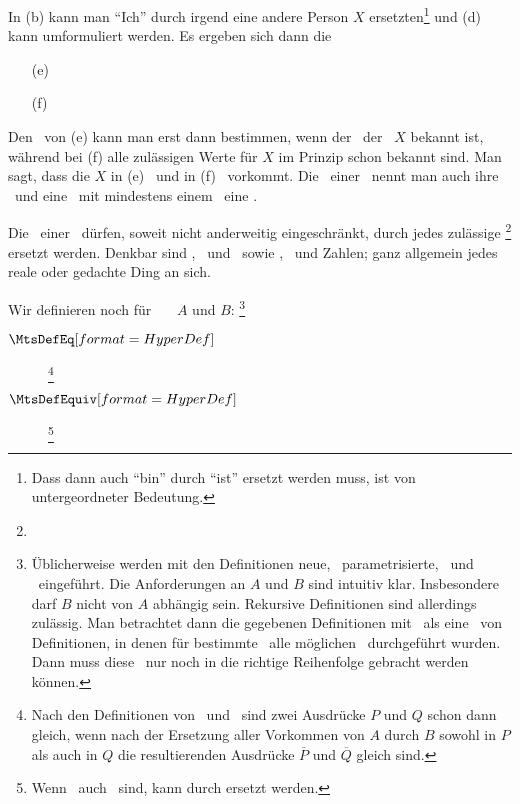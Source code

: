 In (b) kann man "`Ich"' durch irgend eine andere Person $X$ ersetzten\footnote{Dass dann auch "`bin"' durch "`ist"' ersetzt werden muss, ist von untergeordneter Bedeutung.} und (d) kann umformuliert werden.
Es ergeben sich dann die \Aussagen
\begin{enumerate}
	\item[(e)] \label{Bsp:e} 
	\item[(f)] \label{Bsp:f} 
\end{enumerate}
Den \Wahrheitswert\ von (e) kann man erst dann bestimmen, wenn der \Wert\ der \Variablen\ $X$ bekannt ist, während bei (f) alle zulässigen Werte für $X$ im Prinzip schon bekannt sind.
Man sagt, dass die \Variable $X$ in (e) \freiV\ und in (f) \gebundenV\ vorkommt.
Die \freienVariablen\ einer \Aussage\ nennt man auch ihre \Parameter\ und eine \Aussage\ mit mindestens einem \Parameter\ eine \parametrisierteAussage.

Die \Parameter\ einer \Aussage\ dürfen, soweit nicht anderweitig eingeschränkt, durch jedes zulässige \DefFt{\Objekt}\footnote{} ersetzt werden.
Denkbar sind \Symbole, \Formeln\ und \Aussagen\ sowie \Mengen, \Symbolketten\ und Zahlen; ganz allgemein jedes reale oder gedachte Ding an sich.

Wir definieren noch für \Aussagen\ \textbzw\ \Objekte\ $A$ und $B$:%
\footnote{%
	Üblicherweise werden mit den Definitionen neue, \textggf\ parametrisierte, \Begriffe\ und \Symbole\ eingeführt.
	Die Anforderungen an $A$ und $B$ sind intuitiv klar.
	Insbesondere darf $B$ nicht von $A$ abhängig sein.
	Rekursive Definitionen sind allerdings zulässig.
	Man betrachtet dann die gegebenen Definitionen mit \Parametern\ als eine \Menge\ von Definitionen, in denen für bestimmte \Parameter\ alle möglichen \Ersetzungen\ durchgeführt wurden.
	Dann muss diese \Menge\ nur noch in die richtige Reihenfolge gebracht werden können.
}
\begin{description}
	\item[] 
	\item[$\defSym{\MtsDefEq}$]  %
	\footnote{%
		Nach den Definitionen von \MtsDefEquiv\ und \MtsDefEq\ sind zwei Ausdrücke $P$ und $Q$ schon dann gleich, wenn nach der Ersetzung aller Vorkommen von $A$ durch $B$ sowohl in $P$ als auch in $Q$ die resultierenden Ausdrücke $\overline{P}$ und $\overline{Q}$ gleich sind.
	}
	\item[$\defSym{\MtsDefEquiv}$]  %
	\footnote{%
		Wenn \Aussagen\ auch \Objekte\ sind, kann \MtsDefEquiv durch \MtsDefEq ersetzt werden.
	}
\end{description}

